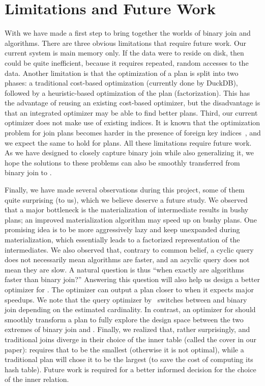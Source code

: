 \section{Limitations and Future Work}\label{sec:discussion}

With \FJ we have made a first step to bring together 
the worlds of binary join and \WCOJ algorithms.
There are three obvious limitations that require future work.  Our
current system is main memory only.  If the data were to reside on
disk, then \COLT could be quite inefficient, because it requires
repeated, random accesses to the data.  Another limitation is that the
optimization of a \FJ plan is split into two phases: a
traditional cost-based optimization (currently done by DuckDB),
followed by a heuristic-based optimization of the \FJ plan
(factorization).  This has the advantage of reusing an existing
cost-based optimizer, but the disadvantage is that an integrated
optimizer may be able to find better plans.  Third, our current
optimizer does not make use of existing indices.  It is known that the
optimization problem for join plans becomes harder in the presence of
foreign key indices~\cite{DBLP:journals/pvldb/LeisGMBK015}, and we
expect the same to hold for \FJ plans.  All these limitations require
future work.  As we have designed \FJ to closely capture binary join
while also generalizing it, we hope the solutions to these problems
can also be smoothly transferred from binary join to \FJ.

Finally, we have made several observations during this project, some
of them quite surprising (to us), which we believe deserve a future
study.  We observed that a major bottleneck is the materialization of
intermediate results in bushy plans; an improved materialization
algorithm may speed up \FJ on bushy plans.  One promising idea is to
be more aggressively lazy and keep \COLTs unexpanded during
materialization, which essentially leads to a factorized
representation of the intermediates.  We also observed that, contrary
to common belief, a cyclic query does not necessarily mean \WCOJ
algorithms are faster, and an acyclic query does not mean they are
slow.  A natural question is thus ``when exactly are \WCOJ algorithms
faster than binary join?''  Answering this question will also help us
design a better optimizer for \FJ.  The optimizer can output a plan
closer to \WCOJ when it expects major speedups.  We note that the
query optimizer by~\cite{DBLP:journals/pvldb/FreitagBSKN20} switches
between \GJ and binary join depending on the estimated cardinality.
In contrast, an optimizer for \FJ should smoothly transform a \FJ plan
to fully explore the design space between the two extremes of binary
join and \GJ.  Finally, we realized that, rather surprisingly, \GJ and
traditional joins diverge in their choice of the inner table (called
the cover in our paper): \GJ requires that to be the smallest
(otherwise it is not optimal), while a traditional plan will chose it
to be the largest (to save the cost of computing its hash table).
Future work is required for a better informed decision for the choice
of the inner relation.


